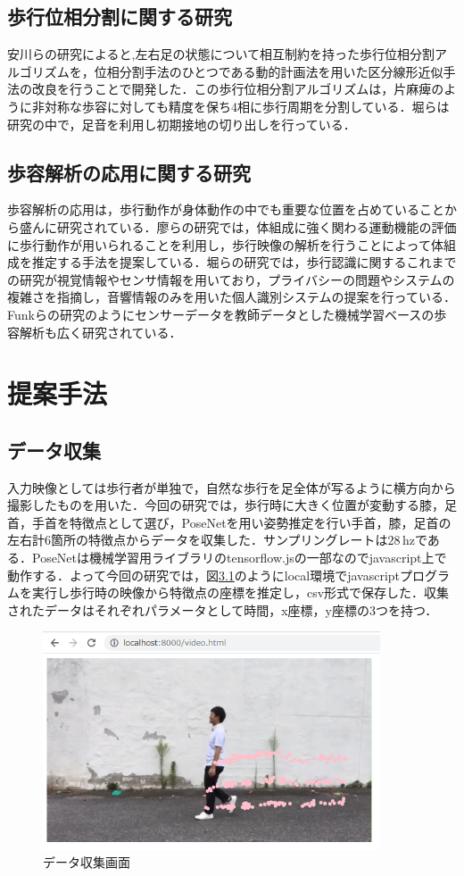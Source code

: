 \documentclass[a4j,10.5pt]{jreport}
\begin{document}
\section{歩行位相分割に関する研究}
安川らの研究\cite{yasukawa}によると,左右足の状態について相互制約を持った歩行位相分割アルゴリズムを，位相分割手法のひとつである動的計画法を用いた区分線形近似手法の改良を行うことで開発した．この歩行位相分割アルゴリズムは，片麻痺のように非対称な歩容に対しても精度を保ち4相に歩行周期を分割している．堀ら\cite{hori}は研究の中で，足音を利用し初期接地の切り出しを行っている．
\section{歩容解析の応用に関する研究}
歩容解析の応用は，歩行動作が身体動作の中でも重要な位置を占めていることから盛んに研究されている．廖ら\cite{cite1}の研究では，体組成に強く関わる運動機能の評価に歩行動作が用いられることを利用し，歩行映像の解析を行うことによって体組成を推定する手法を提案している．堀ら\cite{hori}の研究では，歩行認識に関するこれまでの研究が視覚情報やセンサ情報を用いており，プライバシーの問題やシステムの複雑さを指摘し，音響情報のみを用いた個人識別システムの提案を行っている．Funkら\cite{funk}の研究のようにセンサーデータを教師データとした機械学習ベースの歩容解析も広く研究されている．


\chapter{提案手法}
\section{データ収集}
入力映像としては歩行者が単独で，自然な歩行を足全体が写るように横方向から撮影したものを用いた．今回の研究では，歩行時に大きく位置が変動する膝，足首，手首を特徴点として選び，PoseNetを用い姿勢推定を行い手首，膝，足首の左右計6箇所の特徴点からデータを収集した．サンプリングレートは$28\,\mathrm{hz}$である．PoseNetは機械学習用ライブラリのtensorflow.jsの一部なのでjavascript上で動作する．よって今回の研究では，図\ref{fig:datecollect}のようにlocal環境でjavascriptプログラムを実行し歩行時の映像から特徴点の座標を推定し，csv形式で保存した．収集されたデータはそれぞれパラメータとして時間，x座標，y座標の3つを持つ．
\begin{figure}[H]
  \centering
  \includegraphics[width=10cm]{figs/datacollect1.png}
  \caption{データ収集画面}\label{fig:datecollect}
\end{figure}
\end{document}
